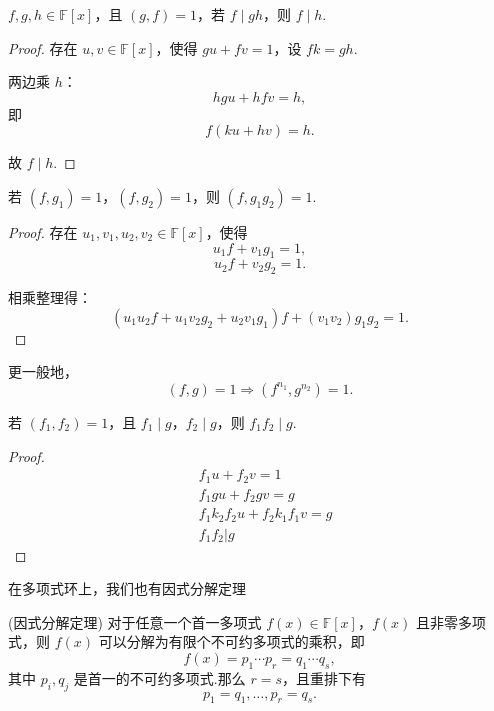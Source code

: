 \begin{corollary}
	\( f, g, h \in \mathbb{F}[x] \)，且 \( (g, f) = 1 \)，若 \( f \mid gh \)，则 \( f \mid h \).
	
\end{corollary}
\begin{proof}
	存在 \( u, v \in \mathbb{F}[x] \)，使得 \( gu + fv = 1 \)，设 \( fk = gh \).
	
	两边乘 \( h \)：
	\[ hgu + hfv = h, \]
	即
	\[ f(ku + hv) = h. \]
	
	故 \( f \mid h \).
	
	
\end{proof}
\begin{corollary}\label{1.3.14}

	若 \( (f, g_1) = 1 \)，\( (f, g_2) = 1 \)，则 \( (f, g_1 g_2) = 1 \).
	

\end{corollary}
\begin{proof}
	存在 \( u_1, v_1, u_2, v_2 \in \mathbb{F}[x] \)，使得
	\[ u_1 f + v_1 g_1 = 1, \]
	\[ u_2 f + v_2 g_2 = 1. \]
	
	相乘整理得：
	\[ (u_1 u_2 f + u_1 v_2 g_2 + u_2 v_1 g_1)f + (v_1 v_2) g_1 g_2 = 1. \]
	
	
\end{proof}
更一般地，
\[ (f, g) = 1 \Rightarrow (f^{n_1}, g^{n_2}) = 1. \]
\begin{corollary}
	若 \( (f_1, f_2) = 1 \)，且 \( f_1 \mid g \)，\( f_2 \mid g \)，则 \( f_1 f_2 \mid g \).
	
	
\end{corollary}
\begin{proof}
$$\begin{aligned}
	& f_1 u+f_2 v=1 \\
	& f_1 g u+f_2 g v=g \\
	& f_1 k_2 f_2 u+f_2 k_1 f_1 v=g \\
	& f_1 f_2 | g
\end{aligned}$$

\end{proof}
在多项式环上，我们也有因式分解定理
\begin{theorem}(因式分解定理)\label{因式分解定理}
对于任意一个首一多项式 \( f(x) \in \mathbb{F}[x] \)，\( f(x) \) 且非零多项式，则 \( f(x) \) 可以分解为有限个不可约多项式的乘积，即
	\[ f(x) = p_1 \cdots p_r = q_1 \cdots q_s, \]
	其中 \( p_i, q_j \) 是首一的不可约多项式.那么 \( r = s \)，且重排下有
	\[ p_1 = q_1, \ldots, p_r = q_s. \]
	
	

\end{theorem}
